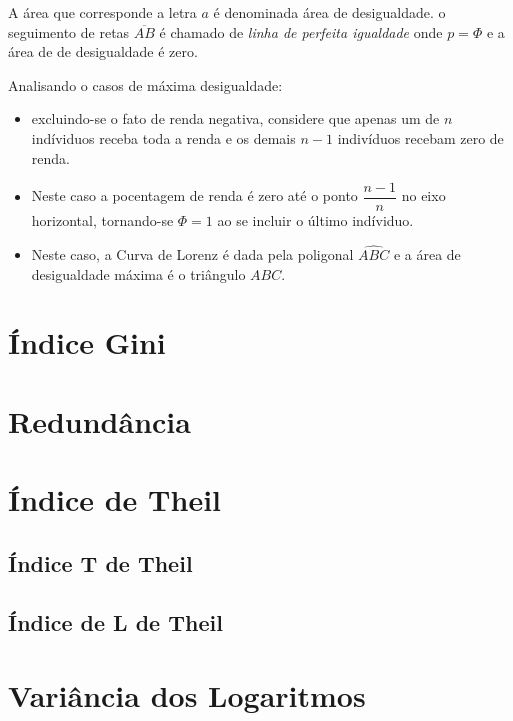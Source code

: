 \documentclass[
]{book}
\providecommand{\tightlist}{%
  \setlength{\itemsep}{0pt}\setlength{\parskip}{0pt}}
\begin{document}
A área que corresponde a letra \(a\) é denominada área de desigualdade. o seguimento de retas \(\overline{AB}\) é chamado de \emph{linha de perfeita igualdade} onde \(p=\Phi\) e a área de de desigualdade é zero.

Analisando o casos de máxima desigualdade:

\begin{itemize}
\tightlist
\item
  excluindo-se o fato de renda negativa, considere que apenas um de \(n\) indíviduos receba toda a renda e os demais \(n-1\) indivíduos recebam zero de renda.
\item
  Neste caso a pocentagem de renda é zero até o ponto \(\dfrac{n-1}{n}\) no eixo horizontal, tornando-se \(\Phi = 1\) ao se incluir o último indíviduo.
\item
  Neste caso, a Curva de Lorenz é dada pela poligonal \(\widehat{ABC}\) e a área de desigualdade máxima é o triângulo \(ABC\).
\end{itemize}

\hypertarget{uxedndice-gini}{%
\section{Índice Gini}\label{uxedndice-gini}}

\hypertarget{redunduxe2ncia}{%
\section{Redundância}\label{redunduxe2ncia}}

\hypertarget{uxedndice-de-theil}{%
\section{Índice de Theil}\label{uxedndice-de-theil}}

\hypertarget{uxedndice-t-de-theil}{%
\subsection{Índice T de Theil}\label{uxedndice-t-de-theil}}

\hypertarget{uxedndice-de-l-de-theil}{%
\subsection{Índice de L de Theil}\label{uxedndice-de-l-de-theil}}

\hypertarget{variuxe2ncia-dos-logaritmos}{%
\section{Variância dos Logaritmos}\label{variuxe2ncia-dos-logaritmos}}
\end{document}
